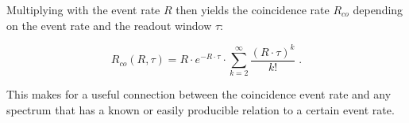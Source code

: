 Multiplying with the event rate $R$ then yields the coincidence rate $R_{co}$ depending on the event rate and the readout window $\tau$:

\begin{equation}
    R_{co}(R,\tau) = R \cdot e^{- R\cdot\tau} \cdot \sum_{k=2}^\infty \frac{{(R\cdot\tau)}^k}{k!}\;.
    \label{eq:multi_rate}
\end{equation}

This makes for a useful connection between the coincidence event rate and any spectrum that has a known or easily producible relation to a certain event rate.





